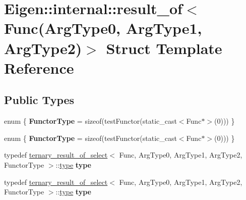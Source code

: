 \hypertarget{struct_eigen_1_1internal_1_1result__of_3_01_func_07_arg_type0_00_01_arg_type1_00_01_arg_type2_08_4}{}\section{Eigen\+:\+:internal\+:\+:result\+\_\+of$<$ Func(Arg\+Type0, Arg\+Type1, Arg\+Type2)$>$ Struct Template Reference}
\label{struct_eigen_1_1internal_1_1result__of_3_01_func_07_arg_type0_00_01_arg_type1_00_01_arg_type2_08_4}
\subsection*{Public Types}
\begin{DoxyCompactItemize}
\item 
\mbox{\label{struct_eigen_1_1internal_1_1result__of_3_01_func_07_arg_type0_00_01_arg_type1_00_01_arg_type2_08_4_aae8ad45b52231a61abbaee0a3299a42f}} 
enum \{ {\bfseries Functor\+Type} = sizeof(test\+Functor(static\+\_\+cast$<$Func$\ast$$>$(0)))
 \}
\item 
\mbox{\label{struct_eigen_1_1internal_1_1result__of_3_01_func_07_arg_type0_00_01_arg_type1_00_01_arg_type2_08_4_af8848ae929f0b49bb71ce4f4abd2d1b3}} 
enum \{ {\bfseries Functor\+Type} = sizeof(test\+Functor(static\+\_\+cast$<$Func$\ast$$>$(0)))
 \}
\item 
\mbox{\label{struct_eigen_1_1internal_1_1result__of_3_01_func_07_arg_type0_00_01_arg_type1_00_01_arg_type2_08_4_acb34a93dd86b197d202b904fc55d8e35}} 
typedef \hyperlink{struct_eigen_1_1internal_1_1ternary__result__of__select}{ternary\+\_\+result\+\_\+of\+\_\+select}$<$ Func, Arg\+Type0, Arg\+Type1, Arg\+Type2, Functor\+Type $>$\+::\hyperlink{group___sparse_core___module}{type} {\bfseries type}
\item 
\mbox{\label{struct_eigen_1_1internal_1_1result__of_3_01_func_07_arg_type0_00_01_arg_type1_00_01_arg_type2_08_4_acb34a93dd86b197d202b904fc55d8e35}} 
typedef \hyperlink{struct_eigen_1_1internal_1_1ternary__result__of__select}{ternary\+\_\+result\+\_\+of\+\_\+select}$<$ Func, Arg\+Type0, Arg\+Type1, Arg\+Type2, Functor\+Type $>$\+::\hyperlink{group___sparse_core___module}{type} {\bfseries type}
\end{DoxyCompactItemize}
